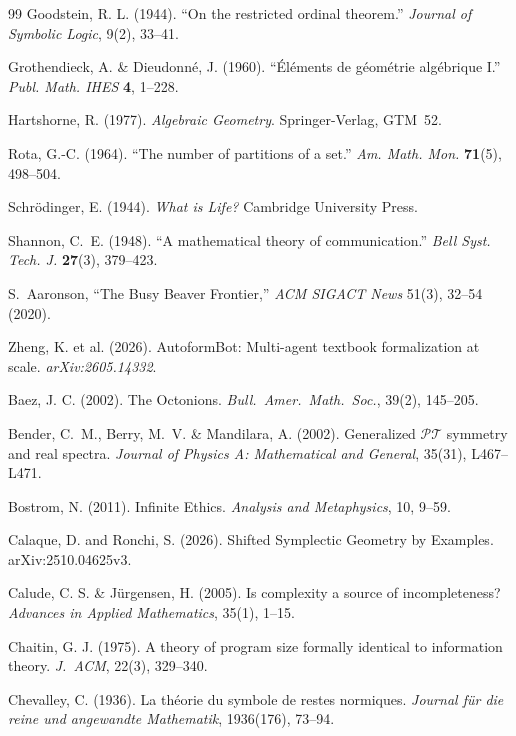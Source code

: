 \vspace{2em}
\begin{thebibliography}{99}
Goodstein, R. L. (1944).
``On the restricted ordinal theorem.''
\textit{Journal of Symbolic Logic}, 9(2), 33--41.

Grothendieck, A. \& Dieudonn\'e, J. (1960).
``\'El\'ements de g\'eom\'etrie alg\'ebrique I.''
\textit{Publ. Math. IHES} \textbf{4}, 1--228.

Hartshorne, R. (1977).
\textit{Algebraic Geometry}. Springer-Verlag, GTM~52.

Rota, G.-C. (1964).
``The number of partitions of a set.''
\textit{Am. Math. Mon.} \textbf{71}(5), 498--504.

Schr\"odinger, E. (1944).
\textit{What is Life?} Cambridge University Press.

Shannon, C.~E. (1948).
``A mathematical theory of communication.''
\textit{Bell Syst. Tech. J.} \textbf{27}(3), 379--423.

S.~Aaronson,
``The Busy Beaver Frontier,''
\emph{ACM SIGACT News} 51(3), 32--54 (2020).

Zheng, K. et al. (2026). AutoformBot: Multi-agent textbook formalization at scale. \emph{arXiv:2605.14332}.

Baez, J. C. (2002). The Octonions. \emph{Bull.\ Amer.\ Math.\ Soc.}, 39(2), 145--205.

Bender, C.~M., Berry, M.~V. \& Mandilara, A. (2002).
Generalized $\mathcal{PT}$ symmetry and real spectra.
\emph{Journal of Physics A: Mathematical and General}, 35(31), L467--L471.

Bostrom, N. (2011). Infinite Ethics. \emph{Analysis and Metaphysics}, 10, 9--59.

Calaque, D. and Ronchi, S. (2026). Shifted Symplectic Geometry by Examples. arXiv:2510.04625v3.

Calude, C. S. \& J\"urgensen, H. (2005). Is complexity a source of incompleteness? \emph{Advances in Applied Mathematics}, 35(1), 1--15.

Chaitin, G. J. (1975). A theory of program size formally identical to information theory. \emph{J.\ ACM}, 22(3), 329--340.

Chevalley, C. (1936). La th\'eorie du symbole de restes normiques. \emph{Journal f\"ur die reine und angewandte Mathematik}, 1936(176), 73--94.


\end{thebibliography}
